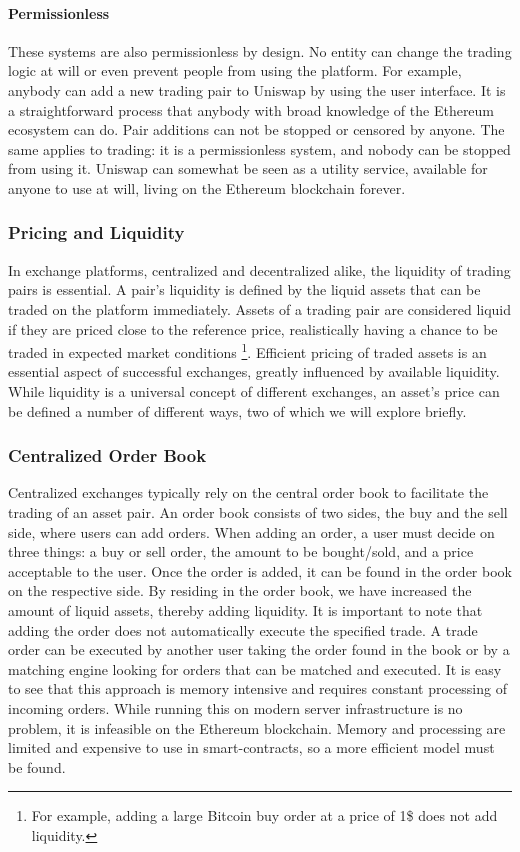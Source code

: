 \documentclass[../../thesis.tex]{subfiles}
\begin{document}
\paragraph{Permissionless}
These systems are also permissionless by design. No entity can change the trading logic at will or even prevent people from using the platform. For example, anybody can add a new trading pair to Uniswap by using the user interface. It is a straightforward process that anybody with broad knowledge of the Ethereum ecosystem can do. Pair additions can not be stopped or censored by anyone. The same applies to trading: it is a permissionless system, and nobody can be stopped from using it. Uniswap can somewhat be seen as a utility service, available for anyone to use at will, living on the Ethereum blockchain forever.

\subsubsection{Pricing and Liquidity}
In exchange platforms, centralized and decentralized alike, the liquidity of trading pairs is essential. A pair's liquidity is defined by the liquid assets that can be traded on the platform immediately. Assets of a trading pair are considered liquid if they are priced close to the reference price, realistically having a chance to be traded in expected market conditions \footnote{For example, adding a large Bitcoin buy order at a price of 1\$ does not add liquidity.}. Efficient pricing of traded assets is an essential aspect of successful exchanges, greatly influenced by available liquidity. While liquidity is a universal concept of different exchanges, an asset's price can be defined a number of different ways, two of which we will explore briefly. 

\subsubsection{Centralized Order Book}
Centralized exchanges typically rely on the central order book to facilitate the trading of an asset pair. An order book consists of two sides, the buy and the sell side, where users can add orders. When adding an order, a user must decide on three things: a buy or sell order, the amount to be bought/sold, and a price acceptable to the user. Once the order is added, it can be found in the order book on the respective side. By residing in the order book, we have increased the amount of liquid assets, thereby adding liquidity. It is important to note that adding the order does not automatically execute the specified trade. A trade order can be executed by another user taking the order found in the book or by a matching engine looking for orders that can be matched and executed. It is easy to see that this approach is memory intensive and requires constant processing of incoming orders. While running this on modern server infrastructure is no problem, it is infeasible on the Ethereum blockchain. Memory and processing are limited and expensive to use in smart-contracts, so a more efficient model must be found.
\end{document}
